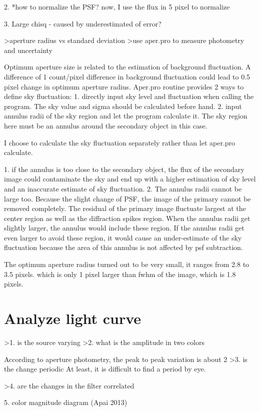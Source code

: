 \documentclass[paper=letter, fontsize=11pt]{scrartcl} %
\numberwithin{equation}{section} %
\numberwithin{figure}{section} %
\numberwithin{table}{section} %
\begin{document}
2. *how to normalize the PSF?  
now, I use the flux in 5 pixel to normalize

3. Large chisq  
- caused by underestimated of error?



>aperture radius vs standard deviation
>use aper.pro  to measure photometry and uncertainty

Optimum aperture size is related to the estimation of background fluctuation. A difference of 1 count/pixel difference in background fluctuation could lead to 0.5 pixel change in optimum aperture radius. Aper.pro routine provides 2 ways to define sky fluctuation:
1. ﻿﻿﻿﻿directly input sky level and fluctuation when calling the program. The sky value and sigma should be calculated before hand.
2. input annulus radii of the sky region and let the program calculate it. The sky region here must be an annulus around the secondary object in this case.

I choose to calculate the sky fluctuation separately rather than let aper.pro calculate.     

1. if the annulus is too close to the secondary object, the flux of the secondary image could contaminate the sky and end up with a higher estimation of sky level and an inaccurate estimate of sky fluctuation.    
2. The annulus radii cannot be large too. Because the slight change of PSF, the image of the primary cannot be removed completely. The residual of the primary image fluctuate largest at the center region as well as the diffraction spikes region.  When the annulus radii get slightly larger, the annulus would include these region. If the annulus radii get even larger to avoid these region, it would cause an under-estimate of the sky fluctuation because the area of this annulus is not affected by psf subtraction. 

The optimum aperture radius turned out to be very small, it ranges from 2.8 to 3.5 pixels. which is only 1 pixel larger than fwhm of the image, which is 1.8 pixels.




\section{Analyze light curve}
>1. is the source varying
>2. what is the amplitude in two colors

According to aperture photometry, the peak to peak variation is about 2%
>3. is the change periodic
At least, it is difficult to find a period by eye.

>4. are the changes in the filter correlated

5. color magnitude diagram (Apai 2013) 
\end{document}
